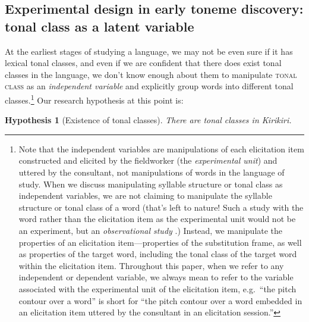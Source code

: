 \documentclass[12pt]{article}
\newtheorem{hypothesis}{Hypothesis}
\begin{document}
\subsection{Experimental design in early toneme discovery: tonal class
  as a latent variable}
\label{sec:pike-toneme-early}

At the earliest stages of studying a language, we may not be even sure
if it has lexical tonal classes, and even if we are confident that there does exist
tonal classes in the language, we don't know enough about them to manipulate \textsc{tonal
class} as an \textit{independent variable} and explicitly group
words into different tonal classes.\footnote{Note that the independent variables are manipulations of each
elicitation item constructed and elicited by the fieldworker (the
\textit{experimental unit}) and uttered by the consultant, not
manipulations of words in the language of study. When we discuss
manipulating syllable structure or tonal class as independent
variables, we are not claiming
to manipulate the syllable structure or tonal class of a word (that's left to nature! Such a
study with the word rather than the elicitation item as the
experimental unit would not be an experiment, but an
\textit{observational study} \citep{Rosenbaum:1999}.) Instead, we
manipulate the properties of an elicitation item---properties of the
substitution frame, as well as properties of the target word,
including the tonal class of the target word within the elicitation
item. Throughout this paper, when we refer to any independent or
dependent variable, we always mean to refer to the variable associated
with the experimental unit of the elicitation item, e.g.\ 
``the pitch contour over a word'' is short for ``the pitch contour
over a word embedded in an elicitation item uttered by the consultant
in an elicitation session.''}
 Our research hypothesis at this
point is:

\begin{hypothesis}[Existence of tonal classes]
\label{hyp:tones} There are tonal classes in Kirikiri.
\end{hypothesis}
\end{document}

